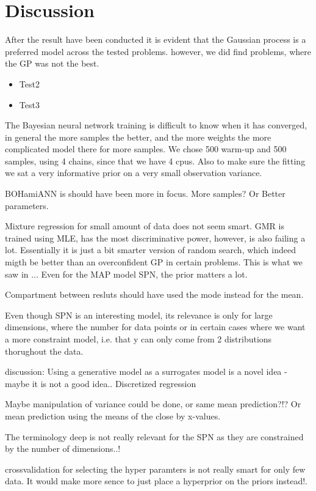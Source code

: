 \chapter{Discussion}
After the result have been conducted it is evident that the Gaussian process is a preferred model across the tested problems.
however, we did find problems, where the GP was not the best. 
\begin{itemize}
    \item Test2
    \item Test3
\end{itemize}

The Bayesian neural network training is difficult to know when it has converged, in general the more samples the better, 
and the more weights the more complicated model there for more samples. We chose 500 warm-up and 500 samples, using 4
chains, since that we have 4 cpus. Also to make sure the fitting we sat a very informative prior on a very small observation
variance. 

BOHamiANN is should have been more in focus. More samples? Or Better parameters. 

Mixture regression for small amount of data does not seem smart. GMR is trained using MLE, has the most discriminative power,
however, is also failing a lot. Essentially it is just a bit smarter version of random search, which indeed migth be
better than an overconfident GP in certain problems. This is what we saw in ... Even for the MAP model SPN, the prior
matters a lot. 

Compartment between resluts should have used the mode instead for the mean. 


Even though SPN is an interesting model, its relevance is only for large dimensions, where the number for data points
or in certain cases where we want a more constraint model, i.e. that y can only come from 2 distributions thorughout the
data. 

discussion: Using a generative model as a surrogates model is a novel idea - maybe it is not a good
idea.. Discretized regression

Maybe manipulation of variance could be done, or same mean prediction?!? Or 
mean prediction using the means of the close by x-values. 

The terminology deep is not really relevant for the SPN as they are constrained by the number of dimensions..!

crossvalidation for selecting the hyper paramters is not really smart for only few data. It would make more sence 
to just place a hyperprior on the priors instead!. 

